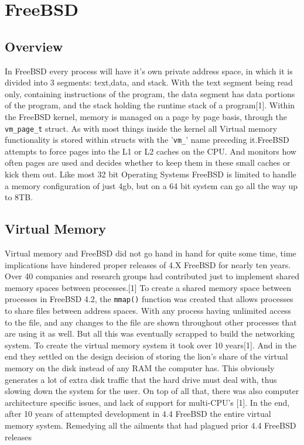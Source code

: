 \documentclass{article}
\begin{document}
\section{FreeBSD}
\subsection{Overview}
    	In FreeBSD every process will have it’s own private address space, in which it is divided into 3 segments: text,data, and stack. With the text segment being read only, containing instructions of the program, the data segment has data portions of the program, and the stack holding the runtime stack of a program[1]. Within the FreeBSD kernel, memory is managed on a page by page basis, through the \texttt{vm\_page\_t} struct. As with most things inside the kernel all Virtual memory functionality is stored within structs with the '\texttt{vm\_}’ name preceding it.FreeBSD attempts to force pages into the L1 or L2 caches on the CPU. And monitors how often pages are used and decides whether to keep them in these small caches or kick them out. Like most 32 bit Operating Systems FreeBSD is limited to handle a memory configuration of just 4gb, but on a 64 bit system can go all the way up to 8TB.

\subsection{Virtual Memory}
		Virtual memory and FreeBSD did not go hand in hand for quite some time, time implications have hindered proper releases of 4.X FreeBSD for nearly ten years. Over 40 companies and research groups had contributed just to implement shared memory spaces between processes.[1] To create a shared memory space between processes in FreeBSD 4.2, the \texttt{mmap()} function was created that allows processes to share files between address spaces. With any process having unlimited access to the file, and any changes to the file are shown throughout other processes that are using it as well. But all this was eventually scrapped to build the networking system. To create the virtual memory system it took over 10 years[1]. And in the end they settled on the design decision of storing the lion's share of the virtual memory on the disk instead of any RAM the computer has. This obviously generates a lot of extra disk traffic that the hard drive must deal with, thus slowing down the system for the user. On top of all that, there was also computer architecture specific issues, and lack of support for multi-CPU’s [1]. In the end, after 10 years of attempted development in 4.4 FreeBSD the entire virtual memory system. Remedying all the ailments that had plagued  prior 4.4 FreeBSD releases
\end{document}
